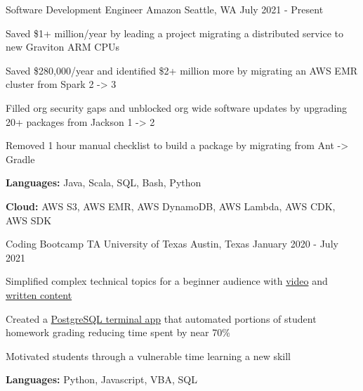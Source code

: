 

\begin{cventries}

  \cventry
    {Software Development Engineer} %
    {Amazon} %
    {Seattle, WA} %
    {July 2021 - Present} %
    {
      \begin{cvitems} %
        \item {Saved \$1+ million/year by leading a project migrating a distributed service to new Graviton ARM CPUs}
        \item {Saved \$280,000/year and identified \$2+ million more by migrating an AWS EMR cluster from Spark 2 -> 3}
        \item {Filled org security gaps and unblocked org wide software updates by upgrading 20+ packages from Jackson 1 -> 2}
        \item {Removed 1 hour manual checklist to build a package by migrating from Ant -> Gradle}
        \item {\textbf{Languages:} Java, Scala, SQL, Bash, Python}
        \item {\textbf{Cloud:} AWS S3, AWS EMR, AWS DynamoDB, AWS Lambda, AWS CDK, AWS SDK}
      \end{cvitems}
    }

  \cventry
    {Coding Bootcamp TA} %
    {University of Texas} %
    {Austin, Texas} %
    {January 2020 - July 2021} %
    {
      \begin{cvitems} %
        \item {Simplified complex technical topics for a beginner audience with \href{https://youtu.be/G4tDjGUD-T4}{video} and \href{https://www.linkedin.com/pulse/how-deal-knowledge-work-frustration-geoff-langenderfer/?trackingId=Z6YGiHpVRFi4PCNxybaPfw\%3D\%3D}{written content}}
        \item {Created a \href{https://youtu.be/ELCZ5dAS6Zg}{PostgreSQL terminal app} that automated portions of student homework grading reducing time spent by near 70\%}
        \item {Motivated students through a vulnerable time learning a new skill}
        \item {\textbf{Languages:} Python, Javascript, VBA, SQL}
      \end{cvitems}
    }

\end{cventries}
